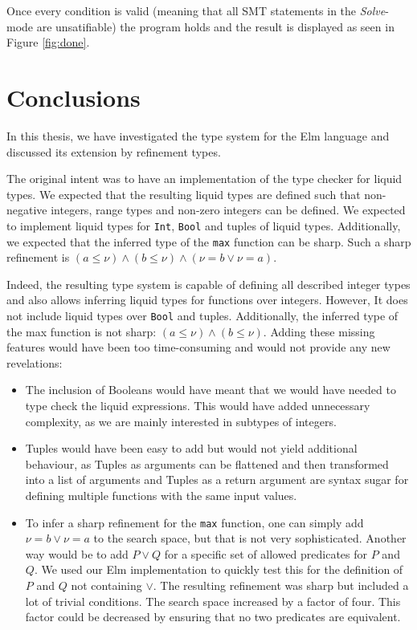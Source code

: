 \documentclass[]{scrbook}
\providecommand{\tightlist}{%
  \setlength{\itemsep}{0pt}\setlength{\parskip}{0pt}}
\theoremstyle{definition}
\theoremstyle{definition}
\theoremstyle{definition}
\theoremstyle{remark}
\begin{document}
Once every condition is valid (meaning that all SMT statements in the
\emph{Solve}-mode are unsatifiable) the program holds and the result is
displayed as seen in Figure \ref{fig:done}.

\chapter{Conclusions}\label{conclusions}

In this thesis, we have investigated the type system for the Elm
language and discussed its extension by refinement types.

The original intent was to have an implementation of the type checker
for liquid types. We expected that the resulting liquid types are
defined such that non-negative integers, range types and non-zero
integers can be defined. We expected to implement liquid types for
\texttt{Int}, \texttt{Bool} and tuples of liquid types. Additionally, we
expected that the inferred type of the \texttt{max} function can be
sharp. Such a sharp refinement is
\((a \leq \nu) \land (b \leq \nu)\land (\nu = b \lor \nu = a)\).

Indeed, the resulting type system is capable of defining all described
integer types and also allows inferring liquid types for functions over
integers. However, It does not include liquid types over \texttt{Bool}
and tuples. Additionally, the inferred type of the max function is not
sharp: \((a \leq \nu) \land (b \leq \nu)\). Adding these missing
features would have been too time-consuming and would not provide any
new revelations:

\begin{itemize}
\tightlist
\item
  The inclusion of Booleans would have meant that we would have needed
  to type check the liquid expressions. This would have added
  unnecessary complexity, as we are mainly interested in subtypes of
  integers.
\item
  Tuples would have been easy to add but would not yield additional
  behaviour, as Tuples as arguments can be flattened and then
  transformed into a list of arguments and Tuples as a return argument
  are syntax sugar for defining multiple functions with the same input
  values.
\item
  To infer a sharp refinement for the \texttt{max} function, one can
  simply add \(\nu = b \lor \nu = a\) to the search space, but that is
  not very sophisticated. Another way would be to add \(P \lor Q\) for a
  specific set of allowed predicates for \(P\) and \(Q\). We used our
  Elm implementation to quickly test this for the definition of \(P\)
  and \(Q\) not containing \(\lor\). The resulting refinement was sharp
  but included a lot of trivial conditions. The search space increased
  by a factor of four. This factor could be decreased by ensuring that
  no two predicates are equivalent.
\end{itemize}
\end{document}
